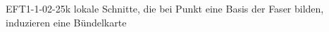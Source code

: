 
\begin{REM}{EFT1-1-02-25}{k lokale Schnitte, die bei Punkt eine Basis der Faser bilden, induzieren eine Bündelkarte}
\end{REM}
